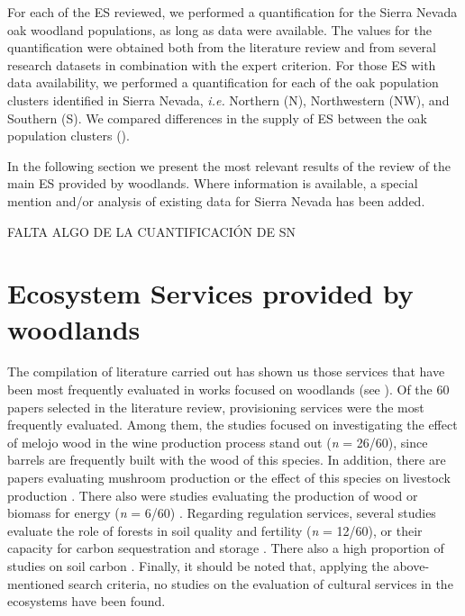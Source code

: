 For each of the ES reviewed, we performed a quantification for the Sierra Nevada oak woodland populations, as long as data were available. The values for the quantification were obtained both from the literature review and from several research datasets in combination with the expert criterion. For those ES with data availability, we performed a quantification for each of the oak population clusters identified in Sierra Nevada, \emph{i.e.} Northern (N), Northwestern (NW), and Southern (S)\autocite[ see][]{PerezLuqueetal2021EcologicalDiversity}. We compared differences in the supply of ES between the oak population clusters ().




In the following section we present the most relevant results of the review of the main ES provided by \Qp woodlands. Where information is available, a special mention and/or analysis of existing data for Sierra Nevada has been added. 

FALTA ALGO DE LA CUANTIFICACIÓN DE SN 

\section{Ecosystem Services provided by \Qp woodlands}\label{sec:es:results}

The compilation of literature carried out has shown us those services that have been most frequently evaluated in works focused on \Qp woodlands (see ). Of the 60 papers selected in the literature review, provisioning services were the most frequently evaluated. Among them, the studies focused on investigating the effect of melojo wood in the wine \autocites[\emph{e.g.}][]{FernandezdeSimonetal2010CharacterizationVolatile,CastroVazquezetal2013EvaluationPortuguese} production process stand out (\emph{n} = 26/60), since barrels are frequently built with the wood of this species. In addition, there are papers evaluating mushroom production \autocites[\emph{e.g.}][]{OriadeRuedaetal2010CouldArtificial} or the effect of this species on livestock production \autocites[\emph{e.g.}][]{Nunezetal2012LivestockManagement}. There also were studies evaluating the production of wood or biomass for energy (\emph{n} = 6/60) \autocites[\emph{e.g.}][]{Mirandaetal2009EnergeticCharacterization}. Regarding regulation services, several studies evaluate the role of \Qp forests in soil quality and fertility (\emph{n} = 12/60), or their capacity for carbon sequestration and storage \autocites[\emph{n} = 12/60; \emph{e.g.}][]{Alvarezetal2014InfluenceTree}. There also a high proportion of studies on soil carbon \autocites[\emph{n} = 8/60; \emph{e.g.}][]{Fonsecaetal2019ImpactTree}. Finally, it should be noted that, applying the above-mentioned search criteria, no studies on the evaluation of cultural services in the \Qp ecosystems have been found.

